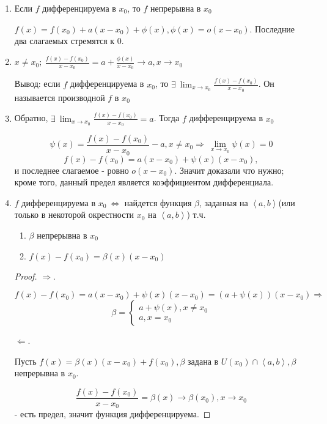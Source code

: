 \documentclass[12pt]{report}
\begin{document}
\begin{prop}
\begin{enumerate}
\item Если $f$ дифференцируема в $x_0$, то $f$ непрерывна в $x_0$

$f(x) = f(x_0) + a(x - x_0) + \phi(x), \phi(x) = o(x - x_0)$. Последние два слагаемых стремятся к $0$.

\item $x \neq x_0; ~\frac{f(x) - f(x_0)}{x - x_0} = a + \frac{\phi(x)}{x - x_0} \to a, x \to x_0$

Вывод: если $f$ дифференцируема в $x_0$, то $\exists ~\lim_{x \to x_0}{\frac{f(x) - f(x_0)}{x - x_0}}$. Он называется производной $f$ в $x_0$

\item Обратно, $\exists ~\lim_{x \to x_0}{\frac{f(x) - f(x_0)}{x - x_0}} = a$. Тогда $f$ дифференцируема в $x_0$

$$\psi(x) = \frac{f(x) - f(x_0)}{x - x_0} - a, x \neq x_0 \Rightarrow ~\lim_{x \to x_0}{\psi(x)} = 0$$
$$f(x) - f(x_0) = a(x - x_0) + \psi(x)(x - x_0),$$
и последнее слагаемое - ровно $o(x - x_0)$. Значит доказали что нужно; кроме того, данный предел является коэффициентом дифференциала.

\item 
$f$ дифференцируема в $x_0 ~\Leftrightarrow$ найдется функция $\beta$, заданная на $\left<a, b\right>$(или только в некоторой окрестности $x_0$ на $\left<a, b\right>$) т.ч.
\begin{enumerate}
\item $\beta$ непрерывна в $x_0$
\item $f(x) - f(x_0) = \beta (x)(x - x_0)$
\end{enumerate} 

\begin{proof}
$\Rightarrow$.

$f(x) - f(x_0) = a(x - x_0) + \psi(x)(x - x_0) = (a + \psi(x))(x - x_0) \Rightarrow$
$$
\beta = \left\{
\begin{matrix}
a + \psi(x), x \neq x_0\\
a, x = x_0
\end{matrix}\right.
$$ 

$\Leftarrow$.

Пусть $f(x) = \beta (x)(x - x_0) + f(x_0), \beta$ задана в $U(x_0) \cap \left<a, b\right>, \beta$ непрерывна в $x_0$.

$$\frac{f(x) - f(x_0)}{x - x_0} = \beta (x) \to \beta (x_0), x \to x_0$$
 - есть предел, значит функция дифференцируема.
\end{proof}
\end{enumerate}
\end{prop}
\end{document}
